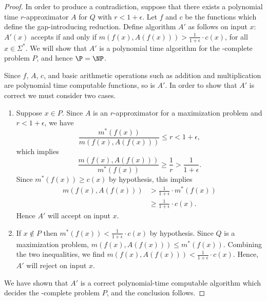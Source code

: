 \documentclass[]{article}
\theoremstyle{plain}
\theoremstyle{definition}
\begin{document}
\begin{proof}
  In order to produce a contradiction, suppose that there exists a polynomial time $r$-approximator $A$ for $Q$ with $r < 1 + \epsilon$.
  Let $f$ and $c$ be the functions which define the gap-introducing reduction.
  Define algorithm $A'$ as follows on input $x$: $A'(x)$ accepts if and only if $m(f(x), A(f(x))) > \frac{1}{1 + \epsilon} \cdot c(x)$, for all $x\in\Sigma^*$.
  We will show that $A'$ is a polynomial time algorithm for the \NP-complete problem $P$, and hence $\P=\NP$.

  Since $f$, $A$, $c$, and basic arithmetic operations such as addition and multiplication are polynomial time computable functions, so is $A'$.
  In order to show that $A'$ is correct we must consider two cases.
  \begin{enumerate}
  \item
    Suppose $x \in P$.
    Since $A$ is an $r$-approximator for a maximization problem and $r < 1 + \epsilon$, we have
    \begin{displaymath}
      \frac{m^*(f(x))}{m(f(x), A(f(x)))} \leq r < 1 + \epsilon,
    \end{displaymath}
    which implies
    \begin{displaymath}
      \frac{m(f(x), A(f(x)))}{m^*(f(x))} \geq \frac{1}{r} > \frac{1}{1 + \epsilon}.
    \end{displaymath}
    Since $m^*(f(x)) \geq c(x)$ by hypothesis, this implies
    \begin{align*}
      m(f(x), A(f(x))) & > \frac{1}{1 + \epsilon} \cdot m^*(f(x)) \\
      & \geq \frac{1}{1 + \epsilon} \cdot c(x).
    \end{align*}
    Hence $A'$ will accept on input $x$.
  \item
    If $x \notin P$ then $m^*(f(x)) < \frac{1}{1 + \epsilon} \cdot c(x)$ by hypothesis.
    Since $Q$ is a maximization problem, $m(f(x), A(f(x))) \leq m^*(f(x))$.
    Combining the two inequalities, we find $m(f(x), A(f(x))) < \frac{1}{1 + \epsilon} \cdot c(x)$.
    Hence, $A'$ will reject on input $x$.
  \end{enumerate}
  We have shown that $A'$ is a correct polynomial-time computable algorithm which decides the \NP-complete problem $P$, and the conclusion follows.
\end{proof}
\end{document}
